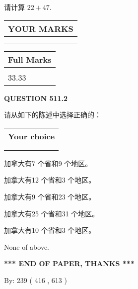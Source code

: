 \documentclass{ctexart}
\begin{document}
  
 
请计算 $ %
22 +  %
47 $.
 

 

 
  
\vspace{0.2in}
  
\noindent\begin{tabular}{|l|}
\hline
 YOUR MARKS  \\
\hline
 \\ 
 \\ 
\hline
\end{tabular}
\hspace{0.05in} \begin{tabular}{|l|}
\hline
 Full Marks  \\
\hline
 \\ 
33.33 \\
\hline
\end{tabular}
{\textbf{\Large{QUESTION
511.2 
}}}
  
  
请从如下的陈述中选择正确的：
  
  
\noindent\hspace{3.0in} \begin{tabular}{|l|}
\hline
Your choice \\
\hline
 \\ 
 \\ 
\hline
\end{tabular}
  
  
 
 
加拿大有7 个省和9 个地区。
 
 
加拿大有12 个省和3 个地区。
 
 
加拿大有9 个省和23 个地区。
 
 
加拿大有25 个省和31 个地区。
 
 
加拿大有10 个省和3 个地区。
 
 
 None of above.
 
 
   
   
 \vspace{0.2in}
 
   
   
   
   
\vspace{1.0in} 
{\textbf{\large{ *** END OF PAPER, THANKS *** }}} 
   
   
\hspace{1.0in} By: 
 239 ( 416 ,  613 )
   
\end{document}
